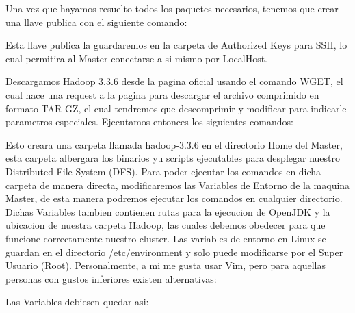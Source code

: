 \documentclass[9pt,letterpaper,twoside]{article}
\begin{document}
\noindent
Una vez que hayamos resuelto todos los paquetes necesarios, tenemos que crear una llave publica con el siguiente
comando:

\begin{code}[H]
    
\end{code}

\noindent
Esta llave publica la guardaremos en la carpeta de Authorized Keys para SSH, lo cual permitira al Master
conectarse a si mismo por LocalHost.

\noindent
Descargamos Hadoop 3.3.6 desde la pagina oficial usando el comando WGET, el cual hace una request a la pagina para descargar el archivo comprimido en formato
TAR GZ, el cual tendremos que descomprimir y modificar para indicarle parametros especiales. Ejecutamos entonces los siguientes comandos:

\begin{code}[H]
    
\end{code}

\noindent
Esto creara una carpeta llamada hadoop-3.3.6 en el directorio Home del Master, esta carpeta albergara los binarios yu scripts ejecutables para desplegar nuestro Distributed File System (DFS).
Para poder ejecutar los comandos en dicha carpeta de manera directa, modificaremos las Variables de Entorno de la maquina Master, de esta manera podremos ejecutar los comandos en cualquier
directorio. Dichas Variables tambien contienen rutas para la ejecucion de OpenJDK y la ubicacion de nuestra carpeta Hadoop, las cuales debemos obedecer para que funcione correctamente nuestro
cluster. Las variables de entorno en Linux se guardan en el directorio /etc/environment y solo puede modificarse por el Super Usuario (Root). Personalmente, a mi me gusta usar Vim, pero para
aquellas personas con gustos inferiores existen alternativas:

\begin{code}[H]
    
\end{code}

\noindent
Las Variables debiesen quedar asi:
\end{document}
